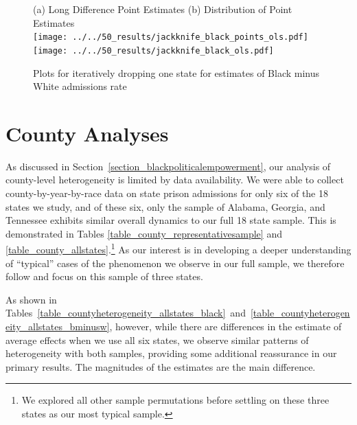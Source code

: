 \documentclass[12pt]{article}
\begin{document}
\begin{figure}[h!]
 	\begin{center}
 	\caption{ Plots for iteratively dropping one state for estimates of Black minus White admissions rate }
 	\small
		(a) Long Difference Point Estimates \hspace*{.4in} (b) Distribution of Point Estimates \\
 			\texttt{[image: ../../50\_results/jackknife\_black\_points\_ols.pdf]}
 			\texttt{[image: ../../50\_results/jackknife\_black\_ols.pdf]} \\
       \smallskip
       \label{figure_jackknife_bminusw}
       \end{center}
\end{figure} \normalsize







\clearpage \newpage
\section{County Analyses}\label{appendix_county}
\setcounter{table}{0}
\setcounter{figure}{0}
\renewcommand{\thetable}{G\arabic{table}}
\renewcommand{\thefigure}{G\arabic{figure}}
\normalsize

As discussed in Section~\ref{section_blackpoliticalempowerment}, our analysis of county-level heterogeneity is limited by data availability. We were able to collect county-by-year-by-race data on state prison admissions for only six of the 18 states we study, and of these six, only the sample of Alabama, Georgia, and Tennessee exhibits similar overall dynamics to our full 18 state sample. This is demonstrated in Tables \ref{table_county_representativesample} and \ref{table_county_allstates}.\footnote{We explored all other sample permutations before settling on these three states as our most typical sample.} As our interest is in developing a deeper understanding of ``typical'' cases of the phenomenon we observe in our full sample, we therefore follow  and focus on this sample of three states.

As shown in Tables~\ref{table_countyheterogeneity_allstates_black}~and~\ref{table_countyheterogeneity_allstates_bminusw}, however, while there are differences in the estimate of average effects when we use all six states, we observe similar patterns of heterogeneity with both samples, providing some additional reassurance in our primary results.  The magnitudes of the estimates are the main difference.
\end{document}
